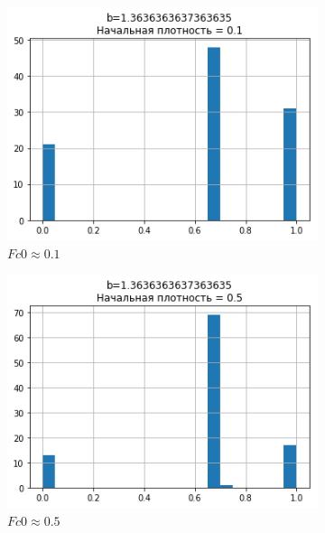 \documentclass[a4paper]{jpconf}
\begin{document}
\begin{figure}[h]
	\centering
	\begin{subfigure}[b]{0.48\textwidth}
		\includegraphics[width = \textwidth]{b1,3_Fc0,1_hist.png}
		\caption{$Fc0 \approx 0.1$}
	\end{subfigure}
	\begin{subfigure}[b]{0.48\textwidth}
		\includegraphics[width = \textwidth]{b1,3_Fc0,5_hist.png}
		\caption{$Fc0 \approx 0.5$}
	\end{subfigure}
	\begin{subfigure}[b]{0.48\textwidth}

\end{subfigure}
\end{figure}
\end{document}
